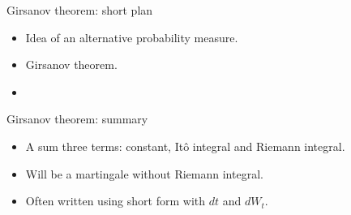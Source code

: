 
\begin{frame} %

    
    \end{frame}
    
    
    \begin{frame}{Girsanov theorem: short plan}
    
      \begin{itemize}[<+->]
        \item Idea of an alternative probability measure.
        \item Girsanov theorem.
        \item 
      \end{itemize}
    
    \end{frame}

\begin{frame}{Girsanov theorem: summary}
        
\begin{itemize}[<+->]
          \item A \alert{sum three terms}: constant, Itô integral and Riemann integral.
          \item Will be a martingale \alert{without Riemann integral}.
          \item Often written using \alert{short form} with $dt$ and $dW_t$.
\end{itemize}
        
\end{frame}
      
